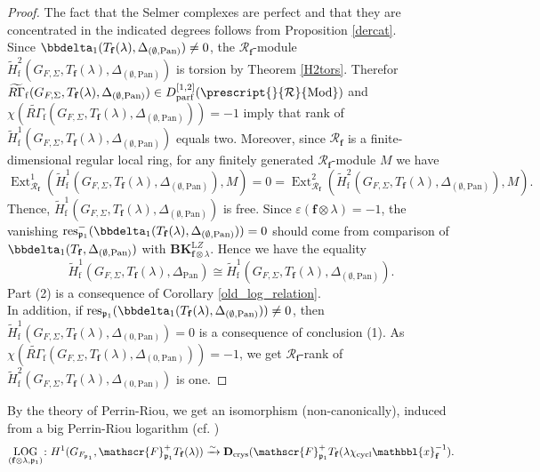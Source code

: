 \documentclass[10pt]{amsart}
\numberwithin{equation}{section}
\theoremstyle{definition}
\theoremstyle{remark} %
\newcommand{\bbl}{\mathbbl}
\newcommand{\mbf}{\mathbf}
\newcommand{\mrm}{\mathrm}
\newcommand{\Ext}{\operatorname{Ext}}
\DeclareMathOperator{\LOG}{LOG}
\newcommand{\pan}{\mathrm{Pan}}
\DeclareMathOperator{\res}{res}
\newcommand{\f}{\mathbf{f}}
\newcommand{\scrF}{\mathscr{F}}
\newcommand{\p}{\mathfrak{p}}
\newcommand{\R}{\mathcal{R}}
\begin{document}
		\begin{proof}
			The fact that the Selmer complexes are perfect and that they are concentrated in the indicated degrees follows from Proposition \ref{dercat}. \\
			Since $\bbdelta_1(T_\f(\lambda), \Delta_{(\emptyset,\pan)}) \neq 0$, the $ \R_{\f} $-module $ \widetilde{H}^2_{\mathrm{f}}(G_{F,\Sigma},T_\f(\lambda),\Delta_{(\emptyset,\pan)}) $ is torsion by Theorem \ref{H2tors}. Therefor $ \widetilde{R\Gamma}_{\mathrm{f}}(G_{F,\Sigma},T_\f(\lambda), \Delta_{(\emptyset,\pan)}) \in D_{\mathrm{parf}}^{[1,2]}(\prescript{}{\R}{\mathrm{Mod}}) $ and $ \chi(\widetilde{R\Gamma}_{\mathrm{f}}(G_{F,\Sigma},T_\f(\lambda), \Delta_{(\emptyset,\pan)}))=-1 $ imply that rank of $ \widetilde{H}^1_{\mathrm{f}}(G_{F,\Sigma},T_\f(\lambda),\Delta_{(\emptyset,\pan)}) $ equals two. Moreover, since $ \R_{\f} $ is a finite-dimensional regular local ring, for any finitely generated $ \R_{\f} $-module $ M $ we have $$ \Ext^1_{\R_{\f}}(\widetilde{H}^1_{\mathrm{f}}(G_{F,\Sigma},T_\f(\lambda),\Delta_{(\emptyset,\pan)}), M) = 0 = \Ext^2_{\R_{\f}}(\widetilde{H}^2_{\mathrm{f}}(G_{F,\Sigma},T_\f(\lambda),\Delta_{(\emptyset,\pan)}), M). $$ 
			Thence, $ \widetilde{H}^1_{\mathrm{f}}(G_{F,\Sigma},T_\f(\lambda),\Delta_{(\emptyset,\pan)}) $ is free. Since $ \varepsilon(\f \otimes \lambda) =-1 $, the vanishing $ \res^-_{\p_1}(\bbdelta_1(T_\f(\lambda), \Delta_{(\emptyset,\pan)})) = 0 $ should come from comparison of $\bbdelta_1(T_\f, \Delta_{(\emptyset,\pan)})$ with $\mathbf{BK}^{\mrm LZ}_{\f\otimes \lambda}$. Hence we have the equality $$ \widetilde{H}^1_{\mathrm{f}}(G_{F,\Sigma},T_\f(\lambda),\Delta_{\pan}) \cong \widetilde{H}^1_{\mathrm{f}}(G_{F,\Sigma},T_\f(\lambda),\Delta_{(\emptyset,\pan)}). $$ 
			Part (2) is a consequence of Corollary \ref{old_log_relation}.\\
			In addition, if $ \res_{\p_1}(\bbdelta_1(T_\f(\lambda), \Delta_{(\emptyset,\pan)})) \ne 0 $, then $ \widetilde{H}^1_{\mathrm{f}}(G_{F,\Sigma},T_\f(\lambda),\Delta_{(0,\pan)}) = 0 $ is a consequence of conclusion (1). As $ \chi(\widetilde{R\Gamma}_{\mathrm{f}}(G_{F,\Sigma},T_\f(\lambda), \Delta_{(0,\pan)})) = -1  $, we get $ \R_{\f} $-rank of $ \widetilde{H}^2_{\mathrm{f}}(G_{F,\Sigma},T_\f(\lambda),\Delta_{(0,\pan)}) $ is one.
		\end{proof}
		By the theory of Perrin-Riou, we get an isomorphism (non-canonically), induced from a big Perrin-Riou logarithm (cf. \cite{perrin-riou_padic})
		\begin{align}
			\label{big_logarithm}
			\LOG_{(\f \otimes \lambda,\p_1)} \colon H^1(G_{F_{\p_1}}, \scrF^+_{\p_1} T_\f(\lambda)) \xrightarrow{\sim} \mbf D_{\rm crys} (\scrF^+_{\p_1} T_\f(\lambda\chi_{\mathrm{cycl}}\bbl{x}_\f^{-1}).
		\end{align}
\end{document}
